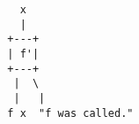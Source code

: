 \begin{center}
\begin{BVerbatim}
    x
    |
  +---+
  | f'|
  +---+
   |  \
   |   |
  f x  "f was called."
\end{BVerbatim}
\end{center}

